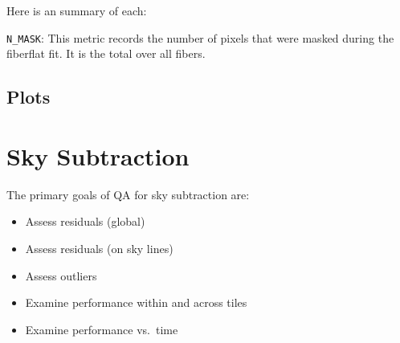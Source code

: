 \documentclass[12pt]{article}
\begin{document}
Here is an summary of each:



\noindent
{\tt N\_MASK}:  This metric records the number of pixels that were
masked during the fiberflat fit.  It is the total over all fibers.


\subsection{Plots}

\section{Sky Subtraction}

The primary goals of QA for sky subtraction are:

\begin{itemize}
\item Assess residuals (global)
\item Assess residuals (on sky lines)
\item Assess outliers
\item Examine performance within and across tiles
\item Examine performance vs.\ time
\end{itemize}



\def\apjl{ApJL} %
\def\aj{AJ} %
\def\apj{ApJ} %
\def\pasp{PASP} %
\def\spie{SPIE} %
\def\apjs{ApJS} %
\def\araa{ARAA} %
\def\aap{A\&A} %
\def\aaps{A\&A~Supl.} %
\def\nat{Nature} %
\def\nar{New Astron. Rev.} %
\def\mnras{MNRAS} %
\def\jcap{JCAP} %
\def\prd{{Phys.~Rev.~D}}        %
\def\physrep{{Phys.~Reports}} %



\end{document}
